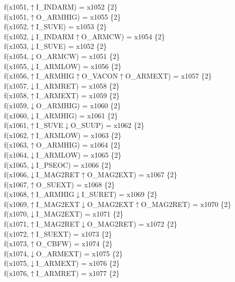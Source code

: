f(x1051,$\uparrow$I\_INDARM) = x1052 \{2\} \\  
f(x1051,$\uparrow$O\_ARMHIG) = x1055 \{2\} \\  
f(x1052,$\uparrow$I\_SUVE) = x1053 \{2\} \\  
f(x1052,$\downarrow$I\_INDARM$\uparrow$O\_ARMCW) = x1054 \{2\} \\  
f(x1053,$\downarrow$I\_SUVE) = x1052 \{2\} \\  
f(x1054,$\downarrow$O\_ARMCW) = x1051 \{2\} \\  
f(x1055,$\downarrow$I\_ARMLOW) = x1056 \{2\} \\  
f(x1056,$\uparrow$I\_ARMHIG$\uparrow$O\_VACON$\uparrow$O\_ARMEXT) = x1057 \{2\} \\  
f(x1057,$\downarrow$I\_ARMRET) = x1058 \{2\} \\  
f(x1058,$\uparrow$I\_ARMEXT) = x1059 \{2\} \\  
f(x1059,$\downarrow$O\_ARMHIG) = x1060 \{2\} \\  
f(x1060,$\downarrow$I\_ARMHIG) = x1061 \{2\} \\  
f(x1061,$\uparrow$I\_SUVE$\downarrow$O\_SUUP) = x1062 \{2\} \\  
f(x1062,$\uparrow$I\_ARMLOW) = x1063 \{2\} \\  
f(x1063,$\uparrow$O\_ARMHIG) = x1064 \{2\} \\  
f(x1064,$\downarrow$I\_ARMLOW) = x1065 \{2\} \\  
f(x1065,$\downarrow$I\_PSEOC) = x1066 \{2\} \\  
f(x1066,$\downarrow$I\_MAG2RET$\uparrow$O\_MAG2EXT) = x1067 \{2\} \\  
f(x1067,$\uparrow$O\_SUEXT) = x1068 \{2\} \\  
f(x1068,$\uparrow$I\_ARMHIG$\downarrow$I\_SURET) = x1069 \{2\} \\  
f(x1069,$\uparrow$I\_MAG2EXT$\downarrow$O\_MAG2EXT$\uparrow$O\_MAG2RET) = x1070 \{2\} \\  
f(x1070,$\downarrow$I\_MAG2EXT) = x1071 \{2\} \\  
f(x1071,$\uparrow$I\_MAG2RET$\downarrow$O\_MAG2RET) = x1072 \{2\} \\  
f(x1072,$\uparrow$I\_SUEXT) = x1073 \{2\} \\  
f(x1073,$\uparrow$O\_CBFW) = x1074 \{2\} \\  
f(x1074,$\downarrow$O\_ARMEXT) = x1075 \{2\} \\  
f(x1075,$\downarrow$I\_ARMEXT) = x1076 \{2\} \\  
f(x1076,$\uparrow$I\_ARMRET) = x1077 \{2\} \\  
